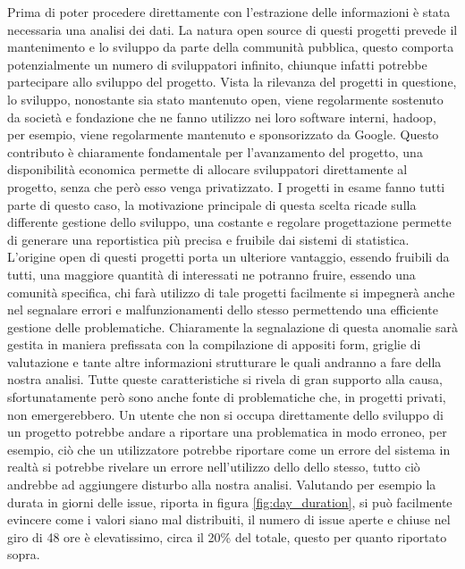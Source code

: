 \documentclass[%
    corpo=12pt,
    twoside,
    oldstyle,
    autoretitolo,
    greek,
    evenboxes,
]{toptesi}
\begin{document}
Prima di poter procedere direttamente con l'estrazione delle informazioni è stata necessaria una analisi dei dati. La natura open source di questi progetti prevede il mantenimento e lo sviluppo da parte della communità pubblica, questo comporta potenzialmente un numero di sviluppatori infinito, chiunque infatti potrebbe partecipare allo sviluppo del progetto. Vista la rilevanza del progetti in questione, lo sviluppo, nonostante sia stato mantenuto open, viene regolarmente sostenuto da società e fondazione che ne fanno utilizzo nei loro software interni, hadoop, per esempio, viene regolarmente mantenuto e sponsorizzato da Google. Questo contributo è chiaramente fondamentale per l'avanzamento del progetto, una disponibilità economica permette di allocare sviluppatori direttamente al progetto, senza che però esso venga privatizzato. I progetti in esame fanno tutti parte di questo caso, la motivazione principale di questa scelta ricade sulla differente gestione dello sviluppo, una costante e regolare progettazione permette di generare una reportistica più precisa e fruibile dai sistemi di statistica. L'origine open di questi progetti porta un ulteriore vantaggio, essendo fruibili da tutti, una maggiore quantità di interessati ne potranno fruire, essendo una comunità specifica, chi farà utilizzo di tale progetti facilmente si impegnerà anche nel segnalare errori e malfunzionamenti dello stesso permettendo una efficiente gestione delle problematiche. Chiaramente la segnalazione di questa anomalie sarà gestita in maniera prefissata con la compilazione di appositi form, griglie di valutazione e tante altre informazioni strutturare le quali andranno a fare della nostra analisi. Tutte queste caratteristiche si rivela di gran supporto alla causa, sfortunatamente però sono anche fonte di problematiche che, in progetti privati, non emergerebbero. Un utente che non si occupa direttamente dello sviluppo di un progetto potrebbe andare a riportare una problematica in modo erroneo, per esempio, ciò che un utilizzatore potrebbe riportare come un errore del sistema in realtà si potrebbe rivelare un errore nell'utilizzo dello dello stesso, tutto ciò andrebbe ad aggiungere disturbo alla nostra analisi. Valutando per esempio la durata in giorni delle issue, riporta in figura \ref{fig:day_duration}, si può facilmente evincere come i valori siano mal distribuiti, il numero di issue aperte e chiuse nel giro di 48 ore è elevatissimo, circa il 20\% del totale, questo per quanto riportato sopra.
\end{document}
